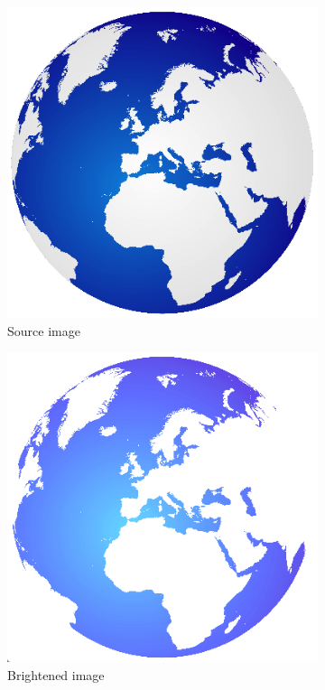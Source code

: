 \begin{figure}
        \centering
        \begin{subfigure}[b]{0.3\textwidth}
                \includegraphics[scale = 0.2]{img/colorGlobe}
                \caption{Source image}
        \end{subfigure}
		\quad
        \begin{subfigure}[b]{0.3\textwidth}
                \includegraphics[scale = 0.2]{img/globeBright}
                \caption{Brightened image}
        \end{subfigure}
        \begin{subfigure}[b]{0.3\textwidth}

\end{subfigure}
\end{figure}

